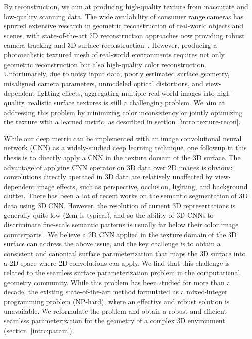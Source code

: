 By reconstruction, we aim at producing high-quality texture from inaccurate and low-quality scanning data. The wide availability of consumer range cameras has spurred extensive research in geometric reconstruction of real-world objects and scenes, with state-of-the-art 3D reconstruction approaches now providing robust camera tracking and 3D surface reconstruction~\cite{newcombe2011kinectfusion,izadi2011kinectfusion,whelan2015elasticfusion,dai2017bundlefusion}. However, producing a photorealistic textured mesh of real-world environments requires not only geometric reconstruction but also high-quality color reconstruction.
Unfortunately, due to noisy input data, poorly estimated surface geometry, misaligned camera parameters, unmodeled optical distortions, and view-dependent lighting effects,  aggregating multiple real-world images into high-quality, realistic surface textures is still a challenging problem. We aim at addressing this problem by minimizing color inconsistency or jointly optimizing the texture with a learned metric, as described in section~\ref{intro:texture-recon}.

While our deep metric can be implemented with an image convolutional neural network (CNN) as a widely-studied deep learning technique, one followup in this thesis is to directly apply a CNN in the texture domain of the 3D surface.
%
The advantage of applying CNN operator on 3D data over 2D images is obvious: convolutions directly operated in 3D data are relatively unaffected by view-dependent image effects, such as perspective, occlusion, lighting, and background clutter.
%
There has been a lot of recent works on the semantic segmentation of 3D data using 3D CNN. However, the resolution of current 3D representations is generally quite low (2cm is typical), and so the ability of 3D CNNs to discriminate fine-scale semantic patterns is usually far below their color image counterparts \cite{long2015fully,he2017mask}.
%
We believe a 2D CNN applied in the texture domain of the 3D surface can address the above issue, and the key challenge is to obtain a consistent and canonical surface parameterization that maps the 3D surface into a 2D space where 2D convolutions can apply.
%
We find that this challenge is related to the seamless surface parameterization problem in the computational geometry community. While this problem has been studied for more than a decade, the existing state-of-the-art method formulated as a mixed-integer programming problem (NP-hard), where an effective and robust solution is unavailable.
%
We reformulate the problem and obtain a robust and efficient seamless parameterization for the geometry of a complex 3D environment (section~\ref{intro:param}).


